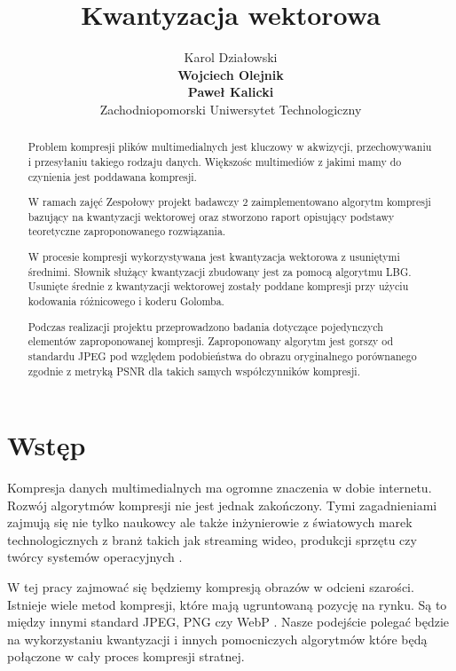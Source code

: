 \documentclass{article}
\title{Kwantyzacja wektorowa}
\author{
  Karol Działowski \\
  \textbf{Wojciech Olejnik} \\
  \textbf{Paweł Kalicki} \\
  Zachodniopomorski Uniwersytet Technologiczny
}
\begin{document}
\maketitle
\begin{abstract}
Problem kompresji plików multimedialnych jest kluczowy w akwizycji, przechowywaniu i przesyłaniu takiego rodzaju danych. Większośc multimediów z jakimi mamy do czynienia jest poddawana kompresji.

W ramach zajęć Zespołowy projekt badawczy 2 zaimplementowano algorytm kompresji bazujący na kwantyzacji wektorowej oraz stworzono raport opisujący podstawy teoretyczne zaproponowanego rozwiązania. 

W procesie kompresji wykorzystywana jest kwantyzacja wektorowa z usuniętymi średnimi. Słownik służący kwantyzacji zbudowany jest za pomocą algorytmu LBG. Usunięte średnie z kwantyzacji wektorowej zostały poddane kompresji przy użyciu kodowania różnicowego i koderu Golomba.

Podczas realizacji projektu przeprowadzono badania dotyczące pojedynczych elementów zaproponowanej kompresji. Zaproponowany algorytm jest gorszy od standardu JPEG pod względem podobieństwa do obrazu oryginalnego porównanego zgodnie z metryką PSNR dla takich samych współczynników kompresji.
\end{abstract}

\newpage

\tableofcontents

\newpage



\section{Wstęp}

Kompresja danych multimedialnych ma ogromne znaczenia w dobie internetu. Rozwój algorytmów kompresji nie jest jednak zakończony. Tymi zagadnieniami zajmują się nie tylko naukowcy ale także inżynierowie z światowych marek technologicznych z branż takich jak streaming wideo, produkcji sprzętu czy twórcy systemów operacyjnych \cite{intel}.

W tej pracy zajmować się będziemy kompresją obrazów w odcieni szarości. Istnieje wiele metod kompresji, które mają ugruntowaną pozycję na rynku. Są to między innymi standard JPEG, PNG czy WebP \cite{ginesu2012objective}. Nasze podejście polegać będzie na wykorzystaniu kwantyzacji i innych pomocniczych algorytmów które będą połączone w cały proces kompresji stratnej.
\end{document}
